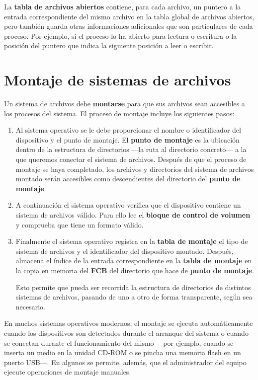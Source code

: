 La \textbf{tabla de archivos abiertos} contiene, para cada archivo, un
puntero a la entrada correspondiente del mismo archivo en la tabla
global de archivos abiertos, pero también guarda otras informaciones
adicionales que son particulares de cada proceso. Por ejemplo, si el
proceso lo ha abierto para lectura o escritura o la posición del puntero
que indica la siguiente posición a leer o escribir.

\section{Montaje de sistemas de
archivos}\label{_montaje_de_sistemas_de_archivos}

{} Un sistema de archivos debe \textbf{montarse} para que sus archivos
sean accesibles a los procesos del sistema. El proceso de montaje
incluye los siguientes pasos:

\begin{enumerate}
\def\labelenumi{\arabic{enumi}.}
\item
  Al sistema operativo se le debe proporcionar el nombre o identificador
  del dispositivo y el punto de montaje. El \textbf{punto de montaje}{}
  es la ubicación dentro de la estructura de directorios ---la ruta al
  directorio concreto--- a la que queremos conectar el sistema de
  archivos. Después de que el proceso de montaje se haya completado, los
  archivos y directorios del sistema de archivos montado serán
  accesibles como descendientes del directorio del \textbf{punto de
  montaje}.
\item
  A continuación el sistema operativo verifica que el dispositivo
  contiene un sistema de archivos válido. Para ello lee el
  \textbf{bloque de control de volumen} y comprueba que tiene un formato
  válido.
\item
  Finalmente el sistema operativo registra en la \textbf{tabla de
  montaje} el tipo de sistema de archivos y el identificador del
  dispositivo montado. Después, almacena el índice de la entrada
  correspondiente en la \textbf{tabla de montaje} en la copia en memoria
  del \textbf{FCB} del directorio que hace de \textbf{punto de montaje}.

  Esto permite que pueda ser recorrida la estructura de directorios de
  distintos sistemas de archivos, pasando de uno a otro de forma
  transparente, según sea necesario.
\end{enumerate}

En muchos sistemas operativos modernos, el montaje se ejecuta
automáticamente cuando los dispositivos son detectados durante el
arranque del sistema o cuando se conectan durante el funcionamiento del
mismo ---por ejemplo, cuando se inserta un medio en la unidad CD-ROM o
se pincha una memoria flash en un puerto USB---. En algunos se permite,
además, que el administrador del equipo ejecute operaciones de montaje
manuales.


